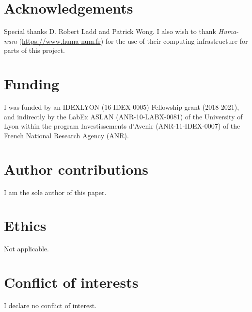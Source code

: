 \documentclass[twoside,onecolumn]{article}
\begin{document}

\section*{Acknowledgements}

Special thanks D. Robert Ladd and Patrick Wong.
I also wish to thank \textit{Huma-num} (\url{https://www.huma-num.fr}) for the use of their computing infrastructure for parts of this project.



\section*{Funding}

I was funded by an IDEXLYON (16-IDEX-0005) Fellowship grant (2018-2021), and indirectly by the LabEx ASLAN (ANR-10-LABX-0081) of the University of Lyon within the program Investissements d’Avenir (ANR-11-IDEX-0007) of the French National Research Agency (ANR).



\section*{Author contributions}

I am the sole author of this paper.



\section*{Ethics}

Not applicable.



\section*{Conflict of interests}

I declare no conflict of interest.




\end{document}
